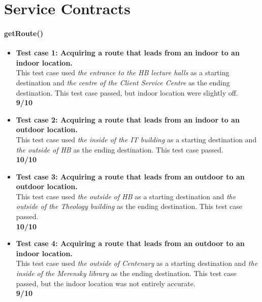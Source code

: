 \documentclass[runningheads,a4paper]{article}
\begin{document}



\begingroup



\tableofcontents


\endgroup

\newpage
	\section{Service Contracts}
	
	\paragraph{getRoute()}
		\begin{itemize}
			\item \textbf{Test case 1: Acquiring a route that leads from an indoor to an indoor location.} \\
							This test case used \textit{the entrance to the HB lecture halls} as a starting destination and \textit{the centre of the Client Service Centre} as the ending destination.
							This test case passed, but indoor location were slightly off.
							\\ \textbf{9/10}
							
			\item \textbf{Test case 2: Acquiring a route that leads from an indoor to an outdoor location.} \\
							This test case used \textit{the inside of the IT building} as a starting destination and \textit{the outside of HB} as the ending destination.
							This test case passed.
							\\ \textbf{10/10}
							
			\item \textbf{Test case 3: Acquiring a route that leads from an outdoor to an outdoor location.} \\
							This test case used \textit{the outside of HB} as a starting destination and \textit{the outside of the Theology building} as the ending destination.
							This test case passed.
							\\ \textbf{10/10}
							
			\item \textbf{Test case 4: Acquiring a route that leads from an outdoor to an indoor location.} \\
							This test case used \textit{the outside of Centenary} as a starting destination and \textit{the inside of the Merensky library} as the ending destination. 
							This test case passed, but the indoor location was not entirely accurate.
							\\ \textbf{9/10}
		\end{itemize}
		
\end{document}
